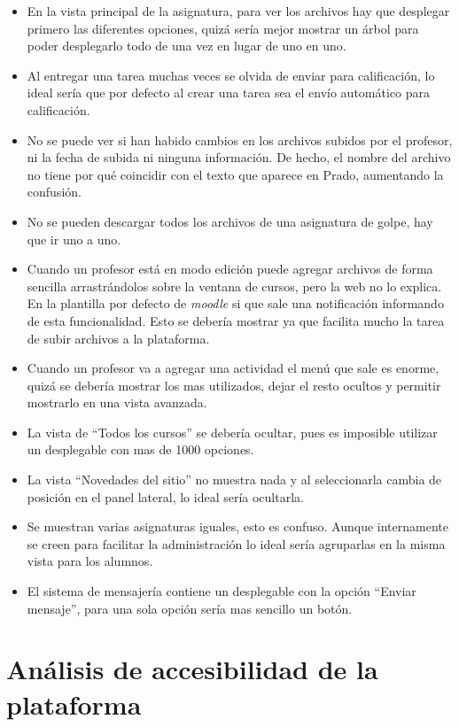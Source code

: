 \begin{itemize}
\item En la vista principal de la asignatura, para ver los archivos hay que desplegar primero las diferentes opciones, quizá sería mejor mostrar un árbol para poder desplegarlo todo de una vez en lugar de uno en uno.
\item Al entregar una tarea muchas veces se olvida de enviar para calificación, lo ideal sería que por defecto al crear una tarea sea el envío automático para calificación.
\item No se puede ver si han habido cambios en los archivos subidos por el profesor, ni la fecha de subida ni ninguna información. De hecho, el nombre del archivo no tiene por qué coincidir con el texto que aparece en Prado, aumentando la confusión.
\item No se pueden descargar todos los archivos de una asignatura de golpe, hay que ir uno a uno.
\item Cuando un profesor está en modo edición puede agregar archivos de forma sencilla arrastrándolos sobre la ventana de cursos, pero la web no lo explica. En la plantilla por defecto de \textit{moodle} si que sale una notificación informando de esta funcionalidad. Esto se debería mostrar ya que facilita mucho la tarea de subir archivos a la plataforma.
\item Cuando un profesor va a agregar una actividad el menú que sale es enorme, quizá se debería mostrar los mas utilizados, dejar el resto ocultos y permitir mostrarlo en una vista avanzada.
\item La vista de ``Todos los cursos'' se debería ocultar, pues es imposible utilizar un desplegable con mas de 1000 opciones.
\item La vista ``Novedades del sitio'' no muestra nada y al seleccionarla cambia de posición en el panel lateral, lo ideal sería ocultarla.
\item Se muestran varias asignaturas iguales, esto es confuso. Aunque internamente se creen para facilitar la administración lo ideal sería agruparlas en la misma vista para los alumnos.
\item El sistema de mensajería contiene un desplegable con la opción ``Enviar mensaje'', para una sola opción sería mas sencillo un botón.

\end{itemize}

\section{Análisis de accesibilidad de la plataforma}

